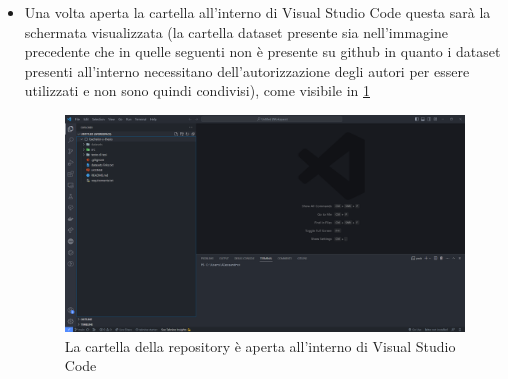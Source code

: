 \begin{itemize}
\item Una volta aperta la cartella all’interno di Visual Studio Code questa sarà la schermata visualizzata (la cartella dataset presente sia nell’immagine precedente che in quelle seguenti non è presente su github in quanto i dataset presenti all’interno necessitano dell’autorizzazione degli autori per essere utilizzati e non sono quindi condivisi), come visibile in \ref{img:4}
\begin{figure}
    \begin{center}    
        \includegraphics[width=0.72\linewidth]{images/image4.png}
        \caption{La cartella della repository è aperta all'interno di Visual Studio Code}
        \label{img:4}
    \end{center}
\end{figure}


\end{itemize}
